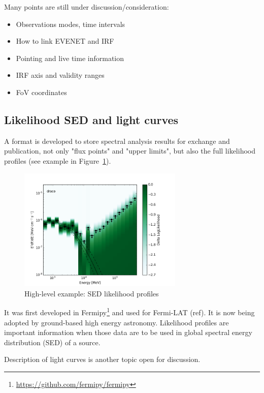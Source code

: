 Many points are still under discussion/consideration:

\begin{itemize}
\item{}Observations modes, time intervals
\item{}How to link EVENET and IRF
\item{}Pointing and live time information
\item{}IRF axis and validity ranges
\item{}FoV coordinates
\end{itemize}

\subsection{Likelihood SED and light curves}

A format is developed to store spectral analysis results for exchange and publication, not only "flux points" and "upper limits", but also the full likelihood profiles (see example in Figure~\ref{fig:sed}).

\begin{figure}[tb]
  \centerline{\includegraphics[width=0.7\textwidth]{figures/llsed_hights}}
  \caption{High-level example: SED likelihood profiles}
  \label{fig:sed}
\end{figure}

It was first developed in Fermipy\footnote{\url{https://github.com/fermipy/fermipy}} and used for Fermi-LAT (ref). It is now being adopted by ground-based high energy astronomy. Likelihood profiles are important information when those data are to be used in global spectral energy distribution (SED) of a source. 

Description of light curves is another topic open for discussion. 
